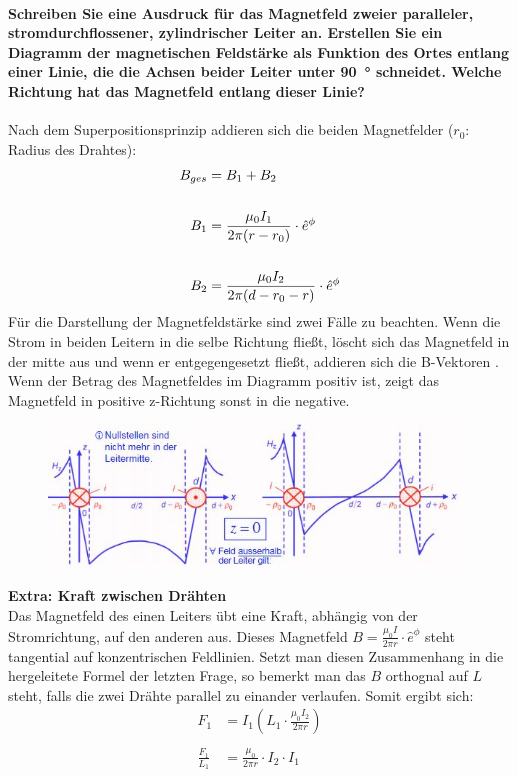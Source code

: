 \documentclass[a4paper, 11pt, ngerman, parskip=half-]{scrartcl}
\begin{document}
\paragraph{Schreiben Sie eine Ausdruck für das Magnetfeld zweier paralleler, stromdurchflossener,
zylindrischer Leiter an. Erstellen Sie ein Diagramm der magnetischen Feldstärke als Funktion des
Ortes entlang einer Linie, die die Achsen beider Leiter unter \SI{90}{\degree} schneidet. Welche
Richtung hat das Magnetfeld entlang dieser Linie?} 
Nach dem Superpositionsprinzip addieren sich die beiden Magnetfelder ($r_0$: Radius des Drahtes):
\begin{align}
    B_{ges} &=B_1 + B_2 \notag \\
    \notag \\
    B_1 &= \frac{\mu_0 I_1}{2 \pi (r -r_0)} \cdot \hat{e}^{\phi} \notag \\
    \notag \\
    B_2 &= \frac{\mu_0 I_2}{2 \pi (d-r_0 - r)} \cdot \hat{e}^{\phi} \notag
\end{align}
Für die Darstellung der Magnetfeldstärke sind zwei Fälle zu beachten. Wenn die Strom in beiden Leitern in die selbe Richtung fließt, löscht sich das Magnetfeld in der mitte aus und wenn er entgegengesetzt fließt, addieren sich die B-Vektoren .
Wenn der Betrag des Magnetfeldes im Diagramm positiv ist, zeigt das Magnetfeld in positive z-Richtung sonst in die negative.
\begin{figure}
    \centering
    \includegraphics[width=11cm]{image/5/5.4.jpg}
\end{figure}
\textbf{Extra: Kraft zwischen Drähten}\\
Das Magnetfeld des einen Leiters übt eine Kraft, abhängig von der Stromrichtung, auf den anderen aus.
Dieses Magnetfeld  $B = \frac{\mu_0 I}{2 \pi r} \cdot \hat{e}^{\phi}$ steht tangential auf konzentrischen Feldlinien.
Setzt man diesen Zusammenhang in die hergeleitete Formel der letzten Frage, so bemerkt man das $B$ orthognal auf $L$ steht, falls die zwei Drähte parallel zu einander verlaufen. 
Somit ergibt sich:
\begin{align}
    F_1 &= I_1(L_1 \cdot \frac{\mu_0 I_2}{2 \pi r} ) \\
    \\
    \frac{F_1}{L_1} &= \frac{\mu_0}{2 \pi r} \cdot I_2 \cdot I_1
\end{align}
\newpage
\end{document}
